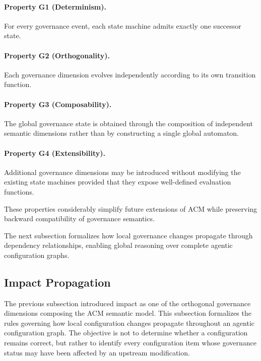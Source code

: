 \documentclass[10pt]{article}
\begin{document}
\paragraph{Property G1 (Determinism).}

For every governance event, each state machine admits exactly one successor
state.

\paragraph{Property G2 (Orthogonality).}

Each governance dimension evolves independently according to its own transition
function.

\paragraph{Property G3 (Composability).}

The global governance state is obtained through the composition of independent
semantic dimensions rather than by constructing a single global automaton.

\paragraph{Property G4 (Extensibility).}

Additional governance dimensions may be introduced without modifying the
existing state machines provided that they expose well-defined evaluation
functions.

These properties considerably simplify future extensions of ACM while
preserving backward compatibility of governance semantics.

The next subsection formalizes how local governance changes propagate through
dependency relationships, enabling global reasoning over complete agentic
configuration graphs.

\subsection{Impact Propagation}
\label{subsec:impact_semantics}

The previous subsection introduced impact as one of the orthogonal governance
dimensions composing the ACM semantic model. This subsection formalizes the
rules governing how local configuration changes propagate throughout an
agentic configuration graph. The objective is not to determine whether a
configuration remains correct, but rather to identify every configuration item
whose governance status may have been affected by an upstream modification.
\end{document}
